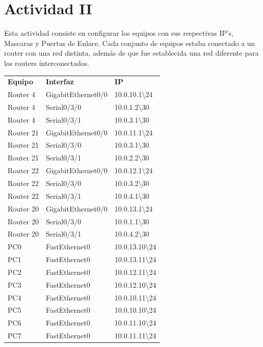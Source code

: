 \documentclass[spanish]{udpreport}
\begin{document}
\pagebreak

\section{Actividad II}

Esta actividad consiste en configurar los equipos con sus respectivas IP's, Mascaras y Puertas de Enlace. Cada conjunto de equipos estaba conectado a un router con una red distinta, además de que fue establecida una red diferente para los routers interconectados.

\begin{table}[H]
\centering
\begin{tabular}{p{3cm}|p{4cm}|p{4cm}}
\textbf{Equipo} & \textbf{Interfaz} & \textbf{IP} \\
       Router 4 & GigabitEthernet0/0 & 10.0.10.1\textbackslash 24 \\
       Router 4 & Serial0/3/0 & 10.0.1.2\textbackslash 30 \\
       Router 4 & Serial0/3/1 & 10.0.3.1\textbackslash 30 \\
       Router 21 & GigabitEthernet0/0 & 10.0.11.1\textbackslash 24 \\
       Router 21 & Serial0/3/0 & 10.0.3.1\textbackslash 30 \\
       Router 21 & Serial0/3/1 & 10.0.2.2\textbackslash 30 \\
       Router 22 & GigabitEthernet0/0 & 10.0.12.1\textbackslash 24 \\
       Router 22 & Serial0/3/0 & 10.0.3.2\textbackslash 30 \\
       Router 22 & Serial0/3/1 & 10.0.4.1\textbackslash 30 \\
       Router 20 & GigabitEthernet0/0 & 10.0.13.1\textbackslash 24 \\
       Router 20 & Serial0/3/0 & 10.0.1.1\textbackslash 30 \\
       Router 20 & Serial0/3/1 & 10.0.4.2\textbackslash 30 \\
       PC0 & FastEthernet0 & 10.0.13.10\textbackslash 24 \\
       PC1 & FastEthernet0 & 10.0.13.11\textbackslash 24 \\
       PC2 & FastEthernet0 & 10.0.12.11\textbackslash 24 \\
       PC3 & FastEthernet0 & 10.0.12.10\textbackslash 24 \\
       PC4 & FastEthernet0 & 10.0.10.11\textbackslash 24 \\
       PC5 & FastEthernet0 & 10.0.10.10\textbackslash 24 \\
       PC6 & FastEthernet0 & 10.0.11.10\textbackslash 24 \\
       PC7 & FastEthernet0 & 10.0.11.11\textbackslash 24 \\
\end{tabular}
\end{table}
\end{document}
